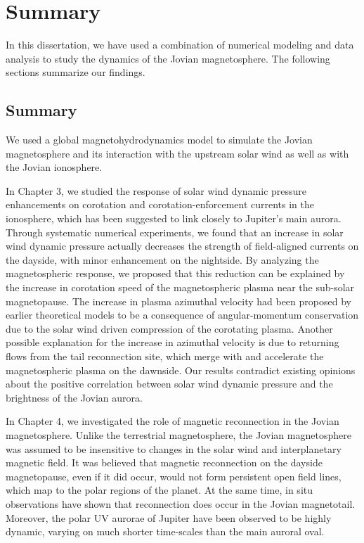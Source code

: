 \chapter{Summary}

In this dissertation, we have used a combination of numerical modeling and  data analysis to study the dynamics of the Jovian magnetosphere. The following sections summarize our findings.

\section{Summary}
We used a global magnetohydrodynamics model to simulate the Jovian magnetosphere and its interaction with the upstream solar wind as well as with the Jovian ionosphere. 

In Chapter 3, we studied the response of solar wind dynamic pressure enhancements on corotation and corotation-enforcement currents in the ionosphere, which has been suggested to link closely to Jupiter's main aurora. Through systematic numerical experiments, we found that an increase in solar wind dynamic pressure actually decreases the strength of field-aligned currents on the dayside, with minor enhancement on the nightside. By analyzing the magnetospheric response, we proposed that this reduction can be explained by the increase in corotation speed of the magnetospheric plasma near the sub-solar magnetopause. The increase in plasma azimuthal velocity had been proposed by earlier theoretical models to be a consequence of angular-momentum conservation due to the solar wind driven compression of the corotating plasma. Another possible explanation for the increase in azimuthal velocity is due to returning flows from the tail reconnection site, which merge with and accelerate the magnetospheric plasma on the dawnside. Our results contradict existing opinions about the positive correlation between solar wind dynamic pressure and the brightness of the Jovian aurora.

In Chapter 4, we investigated the role of magnetic reconnection in the Jovian magnetosphere. Unlike the terrestrial magnetosphere, the Jovian magnetosphere was assumed to be insensitive to changes in the solar wind and interplanetary magnetic field. It was believed that magnetic reconnection on the dayside magnetopause, even if it did occur, would not form persistent open field lines, which map to the polar regions of the planet. At the same time, in situ observations have shown that reconnection does occur in the Jovian magnetotail. Moreover, the polar UV aurorae of Jupiter have been observed to be highly dynamic, varying on much shorter time-scales than the main auroral oval.

